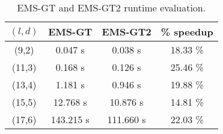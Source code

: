 \begin{table}[h] %
	\renewcommand{\arraystretch}{1.3}
	\centering
	\begin{tabular}{|c|c|c|c|}
	\hline 
	\bfseries\boldmath $(l,d)$ & 
	\bfseries EMS-GT & 
	\bfseries\boldmath EMS-GT2  & 
	\bfseries \% speedup\\
	\hline
	 (9,2) 	&  0.047 s &    0.038 s &    18.33 \%\\
	(11,3) &   0.168 s &    0.126 s &    25.46 \%\\
	(13,4) &   1.181 s &    0.946 s &   19.88 \%\\
	(15,5) &  12.768 s &   10.876 s &   14.81 \%\\
	(17,6) & 143.215 s &  111.660 s &   22.03 \%\\
	\hline\end{tabular}
	
	\caption{EMS-GT and EMS-GT2 runtime evaluation.}
	\label{tbl:final-results-ems}
\end{table}
